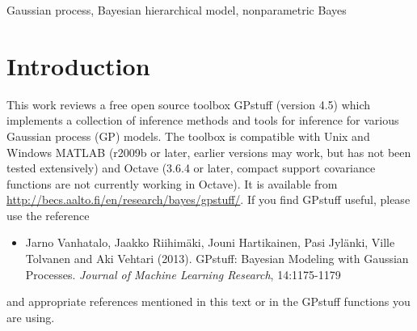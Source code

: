 \documentclass[twoside,11pt]{article}
\newcommand{\pkg}[1]{{\fontseries{b}\selectfont #1}}
\newcommand{\proglang}{}
\begin{document}
\begin{abstract}%
  Gaussian processes (GP) are powerful tools for probabilistic
  modeling purposes. They can be used to define prior distributions 
  over latent functions in hierarchical Bayesian models. The prior
  over functions is defined implicitly by the mean and covariance
  function, which determine the smoothness and variability of the
  function. The inference can then be conducted directly in the
  function space by evaluating or approximating the posterior process.
  Despite their attractive theoretical properties GPs provide
  practical challenges in their implementation. \pkg{GPstuff} is a
  versatile collection of computational tools for GP models compatible
  with Linux and Windows \proglang{MATLAB} and Octave.  It includes,
  among others, various inference methods, sparse approximations and
  tools for model assessment. In this work, we review these tools and
  demonstrate the use of \pkg{GPstuff} in several models.\\ Last updated 2014-04-11.
\end{abstract}

\begin{keywords}
Gaussian process, Bayesian hierarchical model, nonparametric Bayes
\end{keywords}

% 

\newpage

\tableofcontents

\section{Introduction}

This work reviews a free open source toolbox \pkg{GPstuff} (version
4.5) which implements a collection of inference methods and tools for
inference for various Gaussian process (GP) models. The toolbox is
compatible with Unix and Windows \proglang{MATLAB} \citep{MATLAB:2010}
(r2009b or later, earlier versions may work, but has not been tested
extensively) and \proglang{Octave} \citep{octave:2012} (3.6.4 or
later, compact support covariance functions are not currently working
in Octave). It is available from
\url{http://becs.aalto.fi/en/research/bayes/gpstuff/}.
If you find GPstuff useful, please use the reference \citep{Vanhatalo+gpstuff:2013}
\begin{itemize}
\item[] Jarno Vanhatalo, Jaakko Riihim{\"a}ki, Jouni Hartikainen, Pasi
  Jyl{\"a}nki, Ville Tolvanen and Aki Vehtari (2013). GPstuff: Bayesian
  Modeling with Gaussian Processes. \emph{Journal of Machine Learning
    Research}, 14:1175-1179
\end{itemize}
and appropriate references mentioned in this text or in the GPstuff
functions you are using.
\end{document}
